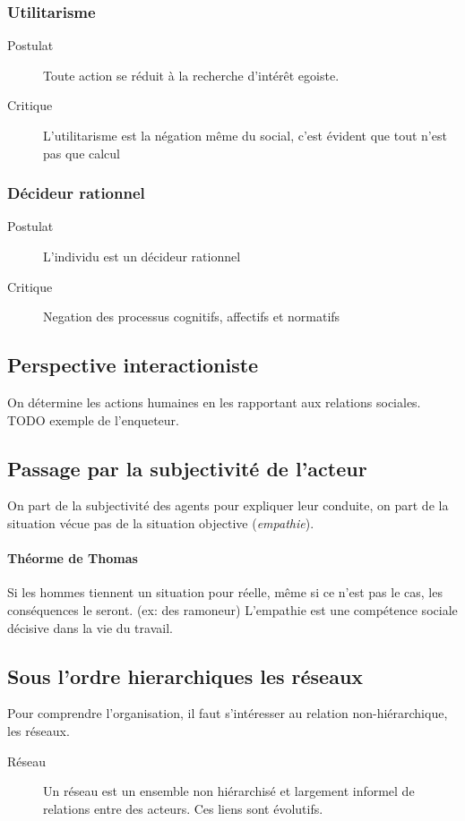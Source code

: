 \documentclass[11pt]{article} %
\begin{document}
\subsubsection{Utilitarisme}

\begin{description}
\item[Postulat] Toute action se réduit à la recherche d'intérêt egoiste.
\item[Critique] L'utilitarisme est la négation même du social, c'est évident que tout n'est pas que calcul
\end{description}

\subsubsection{Décideur rationnel}

\begin{description}
\item[Postulat] L'individu est un décideur rationnel
\item[Critique] Negation des processus cognitifs, affectifs et normatifs
\end{description}



	\subsection{Perspective interactioniste}
		On détermine les actions humaines en les rapportant aux relations sociales. TODO exemple de 
		l'enqueteur.

	\subsection{Passage par la subjectivité de l'acteur}
On part de la subjectivité des agents pour expliquer leur conduite, on part de la situation vécue pas de la situation objective (\textit{empathie}).

		\paragraph{Théorme de Thomas} Si les hommes tiennent un situation pour réelle, même si ce n'est
		pas le cas, les conséquences le seront.  (ex: des ramoneur)
		L'empathie est une compétence sociale décisive dans la vie du travail.

\subsection{Sous l'ordre hierarchiques les réseaux}
		Pour comprendre l'organisation, il faut s'intéresser au relation non-hiérarchique, les réseaux.
\begin{description}
\item[Réseau] Un réseau est un ensemble non hiérarchisé et largement informel de relations entre des acteurs. Ces liens sont évolutifs.
\end{description}
\end{document}
